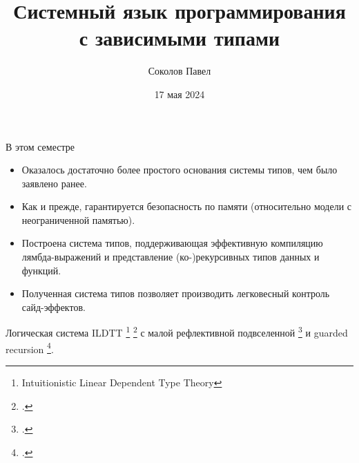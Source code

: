\documentclass{beamer}
\title{Системный язык программирования с зависимыми типами}
\author{Соколов Павел}
\date{17 мая 2024}
\begin{document}
\frame{\titlepage}

\begin{frame}{В этом семестре}
\begin{itemize}
  \item Оказалось достаточно более простого основания системы типов,
    чем было заявлено ранее.
  \item Как и прежде, гарантируется безопасность по памяти
    (относительно модели с неограниченной памятью).
  \item Построена система типов, поддерживающая эффективную компиляцию
    лямбда-выражений и представление (ко-)рекурсивных типов данных и функций.
  \item Полученная система типов позволяет производить легковесный контроль
    сайд-эффектов.
\end{itemize}
\end{frame}

\begin{frame}{Логическая система}
  ILDTT \footnote{Intuitionistic Linear Dependent Type Theory} \footcite{vakar}
  с малой рефлективной подвселенной \footcite{sterling} и guarded recursion
  \footcite{atkey}.
\end{frame}

\begin{frame}
  \printbibliography
\end{frame}
\end{document}
